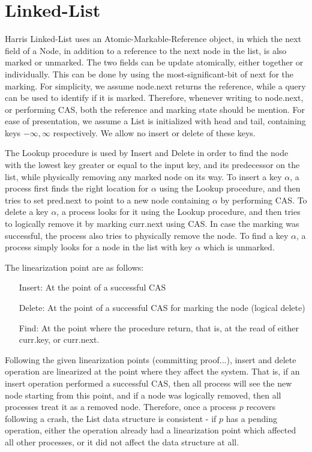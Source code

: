 \section{Linked-List}

Harris Linked-List uses an Atomic-Markable-Reference object, in which the next field of a Node, in addition to a reference to the next node in the list, is also marked or unmarked. The two fields can be update atomically, either together or individually. This can be done by using the most-significant-bit of next for the marking. For simplicity, we assume node.next returns the reference, while a query can be used to identify if it is marked. Therefore, whenever writing to node.next, or performing CAS, both the reference and marking state should be mention.
For ease of presentation, we assume a List is initialized with head and tail, containing keys $-\infty, \infty$ respectively. We allow no insert or delete of these keys.

The Lookup procedure is used by Insert and Delete in order to find the node with the lowest key greater or equal to the input key, and its predecessor on the list, while physically removing any marked node on its way. To insert a key $\alpha$, a process first finds the right location for $\alpha$ using the Lookup procedure, and then tries to set pred.next to point to a new node containing $\alpha$ by performing CAS. To delete a key $\alpha$, a process looks for it using the Lookup procedure, and then tries to logically remove it by marking curr.next using CAS. In case the marking was successful, the process also tries to physically remove the node. To find a key $\alpha$, a process simply looks for a node in the list with key $\alpha$ which is unmarked.

The linearization point are as follows:
\begin{itemize}
	\item [Insert:] At the point of a successful CAS
	\item [Delete:] At the point of a successful CAS for marking the node (logical delete)
	\item [Find:] At the point where the procedure return, that is, at the read of either curr.key, or curr.next.
\end{itemize}

Following the given linearization points (committing proof...), insert and delete operation are linearized at the point where they affect the system. That is, if an insert operation performed a successful CAS, then all process will see the new node starting from this point, and if a node was logically removed, then all processes treat it as a removed node. Therefore, once a process $p$ recovers following a crash, the List data structure is consistent - if $p$ has a pending operation, either the operation already had a linearization point which affected all other processes, or it did not affect the data structure at all.

